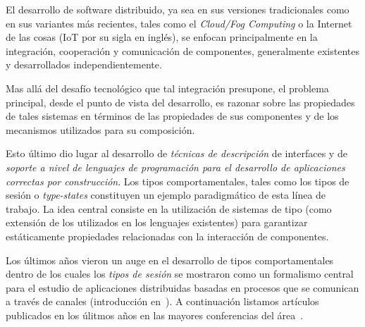 El desarrollo de software distribuido, ya sea en sus versiones tradicionales
como en sus variantes más recientes, tales como el \emph{Cloud/Fog Computing} o
la Internet de las cosas (IoT por su sigla en inglés), se enfocan
principalmente en la integración, cooperación y comunicación de componentes,
generalmente existentes y desarrollados independientemente.

Mas allá del desafío tecnológico que tal integración presupone, el
problema principal, desde el punto de vista del desarrollo, es razonar sobre
las propiedades de tales sistemas en términos de las propiedades de sus
componentes y de los mecanismos utilizados para su composición.

Esto último dio lugar al desarrollo de {\em técnicas de
descripción} de interfaces y de {\em soporte a nivel de lenguajes de
programación para el desarrollo de aplicaciones correctas por construcción}.
Los tipos comportamentales, tales como los tipos de sesión o {\em type-states}
constituyen un ejemplo paradigmático de esta línea de trabajo. La idea central
consiste en la utilización de sistemas de tipo (como extensión de los
utilizados en los lenguajes existentes) para garantizar estáticamente
propiedades relacionadas con la interacción de componentes.

Los últimos años vieron un auge en el desarrollo de tipos comportamentales
dentro de los cuales los {\em tipos de sesión} se mostraron como un formalismo
central para el estudio de aplicaciones distribuidas basadas en procesos que se
comunican a través de canales (introducción en~\cite{HuttelEtAl16}). A
continuación listamos artículos publicados en los úlitmos años en las mayores
conferencias del área~\cite{DBLP:journals/pacmpl/GhilezanPPSY21,
DBLP:journals/pacmpl/HinrichsenBK20, DBLP:journals/pacmpl/Castro-PerezY20,
DBLP:conf/ecoop/ImaiNYY19, DBLP:conf/ecoop/000119, DBLP:conf/esop/JongmansY20,
DBLP:conf/esop/VasconcelosCAM20, DBLP:conf/concur/Horne20,
DBLP:conf/concur/DasP20, DBHPS21,DBLP:conf/cc/Miu0Y021,
DBLP:journals/pacmpl/GriesemerHKLTTW20, DBLP:journals/pacmpl/MajumdarYZ20,
DBLP:conf/concur/InversoMPTT20}.

